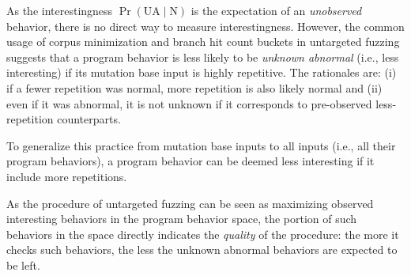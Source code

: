 \documentclass[letterpaper,twocolumn,10pt]{article}
\begin{document}
%
As the interestingness $\Pr(\mathrm{UA} \mid \mathrm{N})$ is the expectation of
an \emph{unobserved} behavior, there is no direct way to measure
interestingness. 
%
However, the common usage of corpus minimization \cite{todo} and branch hit
count buckets \cite{todo} in untargeted fuzzing suggests that a program behavior
is less likely to be \emph{unknown abnormal} (i.e., less interesting) if its
mutation base input is highly repetitive.
%
The rationales are: (i) if a fewer repetition was normal,
more repetition is also likely normal and (ii) even if it was abnormal, it is 
not unknown if it corresponds to pre-observed less-repetition counterparts. 

To generalize this practice from mutation base inputs to all inputs (i.e., all
their program behaviors), a program behavior can be deemed less interesting if
it include more repetitions.

%
%




%
As the procedure of untargeted fuzzing can be seen as maximizing observed
interesting behaviors in the program behavior space, the portion of such 
behaviors in the space directly indicates the \emph{quality} of the
procedure: the more it checks such behaviors, the less the unknown
abnormal behaviors are expected to be left.
\end{document}
